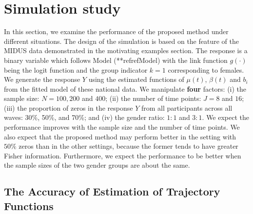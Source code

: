 \section{Simulation study}

In this section, we examine the performance of the proposed method
under different situations. The design of the simulation is based
on the feature of the MIDUS data demonstrated in the motivating
examples section. The response is a binary variable which follows
Model (**refref{Model}) with the link function $g(\cdot)$ being the
logit function and the group indicator $k=1$ corresponding to
females. We generate the response $Y$ using the estimated
functions of $\mu(t)$, $\beta(t)$ and $b_i$ from the fitted model
of these national data. We manipulate \textbf{four} factors: (i)
the sample size: $N=100, 200$ and $400$; (ii) the number of time
points: $J=8$ and $16$; (iii) the proportion of zeros in the
response $Y$ from all participants across all waves: 30\%, 50\%,
and 70\%; and (iv) the gender ratio: $1:1$ and $3:1$. We expect
the performance improves with the sample size and the number of
time points. We also expect that the proposed method may perform
better in the setting with $50\%$ zeros than in the other
settings, because the former tends to have greater Fisher
information. Furthermore, we expect the performance to be better
when the sample sizes of the two gender groups are about the same.

\subsection{The Accuracy of Estimation of Trajectory Functions}


